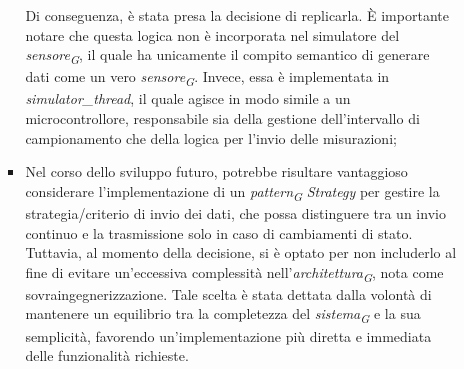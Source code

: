 \begin{itemize}
\begin{itemize}
\begin{itemize}
            Di conseguenza, è stata presa la decisione di replicarla. È importante notare che questa logica non è incorporata nel simulatore del \textit{sensore}\textsubscript{\textit{G}}, il quale ha unicamente il compito semantico di generare dati come un vero \textit{sensore}\textsubscript{\textit{G}}. Invece, essa è implementata in \textit{simulator\_thread}, il quale agisce in modo simile a un microcontrollore, responsabile sia della gestione dell'intervallo di campionamento che della logica per l'invio delle misurazioni;
            \item Nel corso dello sviluppo futuro, potrebbe risultare vantaggioso considerare l'implementazione di un \textit{pattern}\textsubscript{\textit{G}} \textit{Strategy} per gestire la strategia/criterio di invio dei dati, che possa distinguere tra un invio continuo e la trasmissione solo in caso di cambiamenti di stato. Tuttavia, al momento della decisione, si è optato per non includerlo al fine di evitare un'eccessiva complessità nell'\textit{architettura}\textsubscript{\textit{G}}, nota come sovraingegnerizzazione. Tale scelta è stata dettata dalla volontà di mantenere un equilibrio tra la completezza del \textit{sistema}\textsubscript{\textit{G}} e la sua semplicità, favorendo un'implementazione più diretta e immediata delle funzionalità richieste.
        \end{itemize}
    \end{itemize}


\end{itemize}
